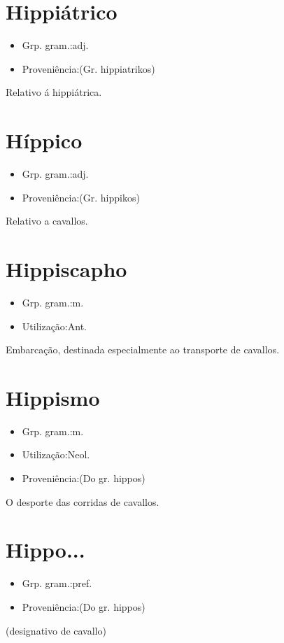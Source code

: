 \documentclass{article}
\begin{document}
\section{Hippiátrico}
\begin{itemize}
\item {Grp. gram.:adj.}
\end{itemize}
\begin{itemize}
\item {Proveniência:(Gr. \textunderscore hippiatrikos\textunderscore )}
\end{itemize}
Relativo á hippiátrica.
\section{Híppico}
\begin{itemize}
\item {Grp. gram.:adj.}
\end{itemize}
\begin{itemize}
\item {Proveniência:(Gr. \textunderscore hippikos\textunderscore )}
\end{itemize}
Relativo a cavallos.
\section{Hippiscapho}
\begin{itemize}
\item {Grp. gram.:m.}
\end{itemize}
\begin{itemize}
\item {Utilização:Ant.}
\end{itemize}
Embarcação, destinada especialmente ao transporte de cavallos.
\section{Hippismo}
\begin{itemize}
\item {Grp. gram.:m.}
\end{itemize}
\begin{itemize}
\item {Utilização:Neol.}
\end{itemize}
\begin{itemize}
\item {Proveniência:(Do gr. \textunderscore hippos\textunderscore )}
\end{itemize}
O desporte das corridas de cavallos.
\section{Hippo...}
\begin{itemize}
\item {Grp. gram.:pref.}
\end{itemize}
\begin{itemize}
\item {Proveniência:(Do gr. \textunderscore hippos\textunderscore )}
\end{itemize}
(designativo de \textunderscore cavallo\textunderscore )
\end{document}
